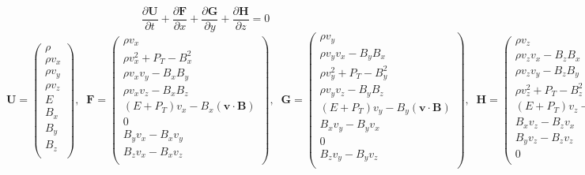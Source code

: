 \begin{equation}
    \frac{\partial \bm{ U}}{\partial t} 
    + \frac{\partial \bm{ F}}{\partial x}
    + \frac{\partial \bm{ G}}{\partial y}
    + \frac{\partial \bm{ H}}{\partial z}
    =0
\end{equation}
{\tiny
\begin{equation}
    \bm{ U} = \left( 
        \begin{array}{c}
            \rho \\
            \rho v_x \\
            \rho v_y \\
            \rho v_z \\
            E\\
            B_x \\
            B_y \\
            B_z \\
    \end{array}
\right),\;\;
    \bm{ F} = \left( 
        \begin{array}{c}
            \rho v_x \\
            \rho v_x^2 + P_T - B_x^2 \\
            \rho v_x v_y  - B_x B_y \\
            \rho v_x v_z  - B_x B_z \\
            (E + P_T)v_x - B_x (\bm{ v}\cdot\bm{ B}) \\
            0 \\
            B_y v_x - B_x v_y\\
            B_z v_x - B_x v_z\\
    \end{array}
\right),\;\;
    \bm{G} = \left( 
        \begin{array}{c}
            \rho v_y  \\
            \rho v_y v_x  - B_y B_x \\
            \rho v_y^2 + P_T - B_y^2 \\
            \rho v_y v_z  - B_y B_z \\
            (E + P_T)v_y - B_y (\bm{ v}\cdot\bm{ B}) \\
            B_x v_y - B_y v_x\\
            0 \\
            B_z v_y - B_y v_z\\
    \end{array}
\right),\;\;
    \bm{H} = \left( 
        \begin{array}{c}
            \rho v_z  \\
            \rho v_z v_x  - B_z B_x \\
            \rho v_z v_y  - B_z B_y \\
            \rho v_z^2 + P_T - B_z^2 \\
            (E + P_T)v_z - B_z (\bm{ v}\cdot\bm{ B}) \\
            B_x v_z - B_z v_x\\
            B_y v_z - B_z v_z\\
            0 \\
    \end{array}
\right)
\end{equation}
}
